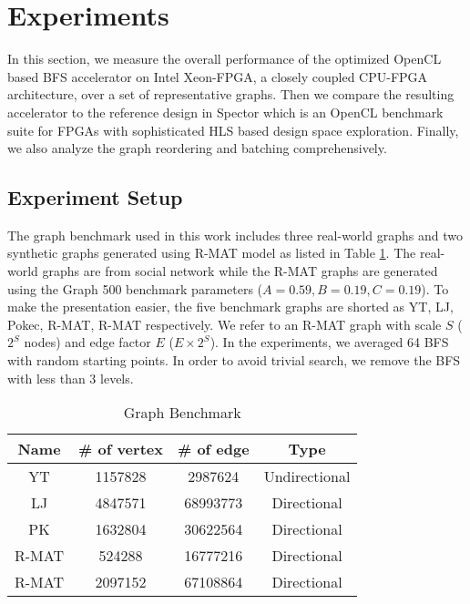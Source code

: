 \section{Experiments} \label{sec:experiment}
In this section, we measure the overall performance of the optimized 
OpenCL based BFS accelerator on Intel Xeon-FPGA, a closely coupled CPU-FPGA
architecture, over a set of representative graphs. Then we compare the 
resulting accelerator to the reference design in Spector \cite{gautier2016spector} 
which is an OpenCL benchmark suite for FPGAs with sophisticated HLS 
based design space exploration. Finally, we also analyze the 
graph reordering and batching comprehensively.

\subsection{Experiment Setup}
The graph benchmark used in this work includes three real-world graphs and 
two synthetic graphs generated using R-MAT model \cite{chakrabarti2004rmat} 
as listed in Table \ref{tab:graph}. The real-world graphs are from social network \cite{yang2012defining, 
leskovec2009community, takac2012data} while the R-MAT graphs are generated 
using the Graph 500 benchmark parameters ($A=0.59, B=0.19, C=0.19$). To make the 
presentation easier, the five benchmark graphs are shorted as YT, 
LJ, Pokec, R-MAT\uppercase\expandafter{}, 
R-MAT\uppercase\expandafter{} respectively. We refer 
to an R-MAT graph with scale $S$ ($2^{S}$ nodes) and edge factor $E$ ($E\times 2^{S}$). 
In the experiments, we averaged 64 BFS with random starting points. 
In order to avoid trivial search, we remove the BFS with less than 3 levels.

\begin{table}
    \centering
  \caption{Graph Benchmark}
  \label{tab:graph}
  \begin{tabular}{cccc}
    \toprule
      Name & \# of vertex & \# of edge & Type \\
    \midrule
      YT \cite{yang2012defining} & 1157828 & 2987624 & Undirectional \\
      LJ \cite{leskovec2009community} & 4847571 & 68993773 & Directional \\
      PK \cite{takac2012data} & 1632804 & 30622564 & Directional \\
      R-MAT\uppercase\expandafter{\romannumeral1} & 524288 & 16777216 & Directional \\
      R-MAT\uppercase\expandafter{\romannumeral2} & 2097152 & 67108864 & Directional \\
  \bottomrule
\end{tabular}
\vspace{-1em}
\end{table}

